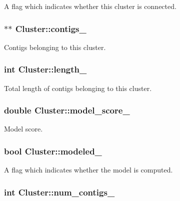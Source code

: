 A flag which indicates whether this cluster is connected. \hypertarget{classCluster_abf682e9b3a02a8188606551b846560d6}{
\subsubsection[{contigs\_\-}]{$\ast$$\ast$ {\bf Cluster::contigs\_\-}}}
\label{classCluster_abf682e9b3a02a8188606551b846560d6}
Contigs belonging to this cluster. \hypertarget{classCluster_ac94216ba6a05b51f363978088164aab9}{
\subsubsection[{length\_\-}]{\setlength{\rightskip}{0pt plus 5cm}int {\bf Cluster::length\_\-}}}
\label{classCluster_ac94216ba6a05b51f363978088164aab9}
Total length of contigs belonging to this cluster. \hypertarget{classCluster_ab415255559e42e87143a1c86acabf5e9}{
\subsubsection[{model\_\-score\_\-}]{\setlength{\rightskip}{0pt plus 5cm}double {\bf Cluster::model\_\-score\_\-}}}
\label{classCluster_ab415255559e42e87143a1c86acabf5e9}
Model score. \hypertarget{classCluster_a4649800ea7d9f5a893dd0259e07ed37a}{
\subsubsection[{modeled\_\-}]{\setlength{\rightskip}{0pt plus 5cm}bool {\bf Cluster::modeled\_\-}}}
\label{classCluster_a4649800ea7d9f5a893dd0259e07ed37a}
A flag which indicates whether the model is computed. \hypertarget{classCluster_a61cd37076cceb450e29110bd7f9aec06}{
\subsubsection[{num\_\-contigs\_\-}]{\setlength{\rightskip}{0pt plus 5cm}int {\bf Cluster::num\_\-contigs\_\-}}}
